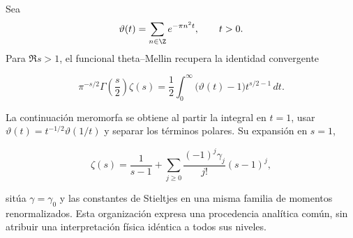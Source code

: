 Sea
\[
\vartheta(t)=\sum_{n\in\Z}e^{-\pi n^2t},\qquad t>0.
\]
Para \(\Re s>1\), el funcional theta--Mellin recupera la identidad convergente

\[
\pi^{-s/2}\Gamma\!\left(\frac{s}{2}\right)\zeta(s)
=\frac12\int_0^\infty
\bigl(\vartheta(t)-1\bigr)t^{s/2-1}\,dt.
\]

La continuaci\'on meromorfa se obtiene al partir la integral en \(t=1\), usar
\(\vartheta(t)=t^{-1/2}\vartheta(1/t)\) y separar los t\'erminos polares. Su expansi\'on en \(s=1\),

\begin{equation}
\zeta(s)=\frac1{s-1}+\sum_{j\ge0}
\frac{(-1)^j\gamma_j}{j!}(s-1)^j,
\label{eq:stieltjes}
\end{equation}

sit\'ua \(\gamma=\gamma_0\) y las constantes de Stieltjes en una misma
familia de momentos renormalizados. Esta organizaci\'on expresa una
procedencia anal\'itica com\'un, sin atribuir una interpretaci\'on f\'isica
id\'entica a todos sus niveles.

